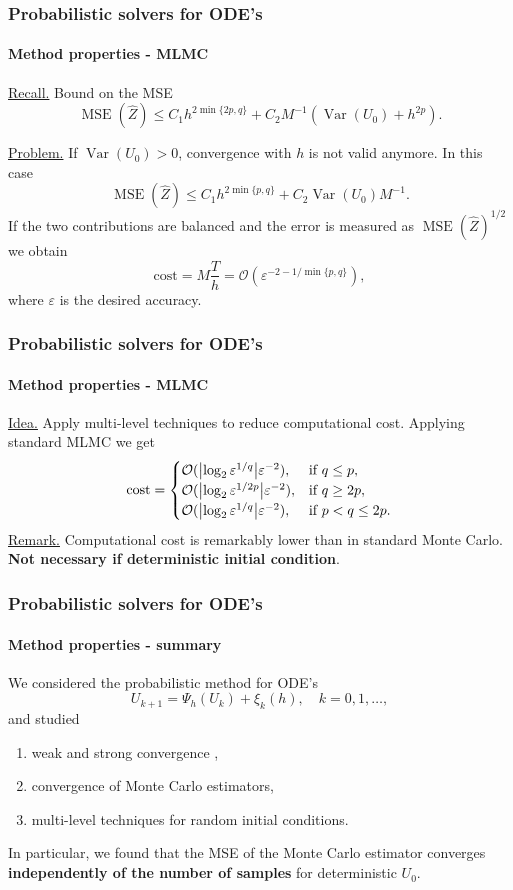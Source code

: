 \documentclass{beamer}
\newcommand{\epl}{\varepsilon}
\newcommand{\MSE}{\operatorname{MSE}}
\newcommand{\Var}{\operatorname{Var}}
\newcommand{\OO}{\mathcal{O}}
\begin{document}
\begin{frame}
	\frametitle{Probabilistic solvers for ODE's}
	\framesubtitle{Method properties - MLMC}
	
	\underline{Recall.} Bound on the MSE
	\begin{equation*}
		\MSE(\hat Z) \leq C_1 h^{2\min\{2p, q\}} + C_2 M^{-1} (\Var(U_0) + h^{2p}).
	\end{equation*}	
	
	\underline{Problem.} If $\Var(U_0) > 0$, convergence with $h$ is not valid anymore. In this case
	\begin{equation*}
		\MSE(\hat Z) \leq C_1 h^{2\min\{p, q\}} + C_2 \Var(U_0) M^{-1}.
	\end{equation*}	
	If the two contributions are balanced and the error is measured as $\MSE(\hat Z)^{1/2}$ we obtain
	\begin{equation*}
		\mathrm{cost} = M \frac{T}{h} = \OO\left(\epl^{-2 - 1/\min\{p, q\}}\right),
	\end{equation*}
	where $\epl$ is the desired accuracy.
\end{frame}

\begin{frame}
	\frametitle{Probabilistic solvers for ODE's}
	\framesubtitle{Method properties - MLMC}	

	\underline{Idea.} Apply multi-level techniques to reduce computational cost. Applying standard MLMC \cite{Gil08} we get
	\begin{equation*}
	\mathrm{cost} = \begin{cases}	\OO(\abs{\log_2\epl^{1/q}}\epl^{-2}), & \text{if } q \leq p, \\
						   	\OO(\abs{\log_2\epl^{1/2p}}\epl^{-2}), & \text{if } q \geq 2p, \\	
						   	\OO(\abs{\log_2\epl^{1/q}}\epl^{-2}), & \text{if } p < q \leq 2p. \\	
			\end{cases}
	\end{equation*}	
	\underline{Remark.} Computational cost is remarkably lower than in standard Monte Carlo. \textbf{Not necessary if deterministic initial condition}.
\end{frame}

\begin{frame}
	\frametitle{Probabilistic solvers for ODE's}
	\framesubtitle{Method properties - summary}
	
	We considered the probabilistic method for ODE's
	\begin{equation*}
		U_{k+1} = \Psi_h(U_k) + \xi_k(h), \quad k = 0, 1, \ldots,
	\end{equation*}
	and studied
	\begin{enumerate}
		\item weak and strong convergence \cite{CGS16},
		\item convergence of Monte Carlo estimators,
		\item multi-level techniques for random initial conditions.
	\end{enumerate}
	In particular, we found that the MSE of the Monte Carlo estimator converges \textbf{independently of the number of samples} for deterministic $U_0$.
\end{frame}
\end{document}
